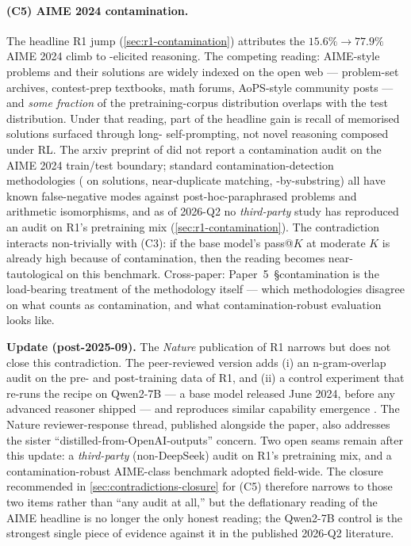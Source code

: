 \paragraph{(C5) AIME 2024 contamination.}
The headline R1 jump (\cref{sec:r1-contamination}) attributes the
$15.6\%\!\to\!77.9\%$ AIME 2024 climb to -elicited reasoning. The
competing reading: AIME-style problems and their solutions are widely
indexed on the open web --- problem-set archives, contest-prep
textbooks, math forums, AoPS-style community posts --- and \emph{some
fraction} of the pretraining-corpus distribution overlaps with the
test distribution. Under that reading, part of the headline gain is
recall of memorised solutions surfaced through long- self-prompting,
not novel reasoning composed under RL. The arxiv preprint of
\citet{deepseek-r1} did not report a contamination audit on the AIME
2024 train/test boundary; standard contamination-detection
methodologies ( on solutions, near-duplicate matching,
-by-substring) all have known false-negative modes
against post-hoc-paraphrased problems and arithmetic isomorphisms, and
as of 2026-Q2 no \emph{third-party} study has reproduced an audit on
R1's pretraining mix (\cref{sec:r1-contamination}). The contradiction
interacts non-trivially with (C3): if the base model's pass@$K$ at
moderate $K$ is already high because of contamination, then the
\citeauthor{rlvr-limits-2025} reading becomes near-tautological on
this benchmark. Cross-paper: Paper~5~\S contamination is the
load-bearing treatment of the methodology  itself --- which
methodologies disagree on what counts as contamination, and what
contamination-robust evaluation looks like.

\textbf{Update (post-2025-09).} The \emph{Nature} publication of R1
\citep{deepseek-r1-nature-2025} narrows but does not close this
contradiction. The peer-reviewed version adds (i) an n-gram-overlap
 audit on the pre- and post-training data of R1, and
(ii) a control experiment that re-runs the  recipe on Qwen2-7B ---
a base model released June 2024, before any advanced reasoner shipped
--- and reproduces similar capability emergence
\citep{deepseek-r1-nature-2025}. The Nature reviewer-response thread,
published alongside the paper, also addresses the sister
``distilled-from-OpenAI-outputs'' concern. Two open seams remain after
this update: a \emph{third-party} (non-DeepSeek) audit on R1's
pretraining mix, and a contamination-robust AIME-class benchmark
adopted field-wide. The closure recommended in
\cref{sec:contradictions-closure} for (C5) therefore narrows to those
two items rather than ``any audit at all,'' but the deflationary
reading of the AIME headline is no longer the only honest reading; the
Qwen2-7B control is the strongest single piece of evidence against it
in the published 2026-Q2 literature.

